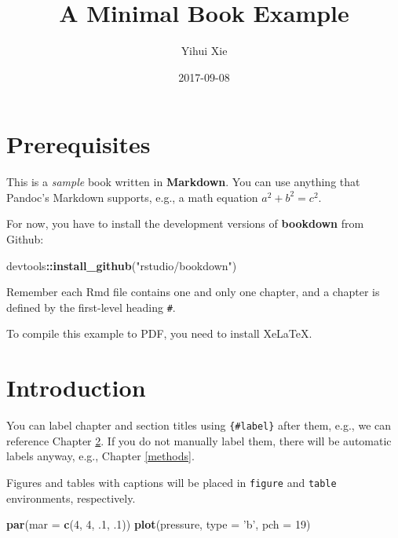 \documentclass[]{book}
\title{A Minimal Book Example}
\author{Yihui Xie}
\date{2017-09-08}
\newenvironment{Shaded}{\begin{snugshade}}{\end{snugshade}}
\newcommand{\KeywordTok}[1]{\textcolor[rgb]{0.13,0.29,0.53}{\textbf{#1}}}
\newcommand{\DataTypeTok}[1]{\textcolor[rgb]{0.13,0.29,0.53}{#1}}
\newcommand{\DecValTok}[1]{\textcolor[rgb]{0.00,0.00,0.81}{#1}}
\newcommand{\StringTok}[1]{\textcolor[rgb]{0.31,0.60,0.02}{#1}}
\newcommand{\OperatorTok}[1]{\textcolor[rgb]{0.81,0.36,0.00}{\textbf{#1}}}
\newcommand{\NormalTok}[1]{#1}
\theoremstyle{definition}
\theoremstyle{definition}
\theoremstyle{definition}
\theoremstyle{remark}
\begin{document}
\maketitle

{
\setcounter{tocdepth}{1}
\tableofcontents
}
\chapter{Prerequisites}\label{prerequisites}

This is a \emph{sample} book written in \textbf{Markdown}. You can use
anything that Pandoc's Markdown supports, e.g., a math equation
\(a^2 + b^2 = c^2\).

For now, you have to install the development versions of
\textbf{bookdown} from Github:

\begin{Shaded}
\begin{Highlighting}[]
\NormalTok{devtools}\OperatorTok{::}\KeywordTok{install_github}\NormalTok{(}\StringTok{"rstudio/bookdown"}\NormalTok{)}
\end{Highlighting}
\end{Shaded}

Remember each Rmd file contains one and only one chapter, and a chapter
is defined by the first-level heading \texttt{\#}.

To compile this example to PDF, you need to install XeLaTeX.

\chapter{Introduction}\label{intro}

You can label chapter and section titles using \texttt{\{\#label\}}
after them, e.g., we can reference Chapter \ref{intro}. If you do not
manually label them, there will be automatic labels anyway, e.g.,
Chapter \ref{methods}.

Figures and tables with captions will be placed in \texttt{figure} and
\texttt{table} environments, respectively.

\begin{Shaded}
\begin{Highlighting}[]
\KeywordTok{par}\NormalTok{(}\DataTypeTok{mar =} \KeywordTok{c}\NormalTok{(}\DecValTok{4}\NormalTok{, }\DecValTok{4}\NormalTok{, .}\DecValTok{1}\NormalTok{, .}\DecValTok{1}\NormalTok{))}
\KeywordTok{plot}\NormalTok{(pressure, }\DataTypeTok{type =} \StringTok{'b'}\NormalTok{, }\DataTypeTok{pch =} \DecValTok{19}\NormalTok{)}
\end{Highlighting}
\end{Shaded}
\end{document}
